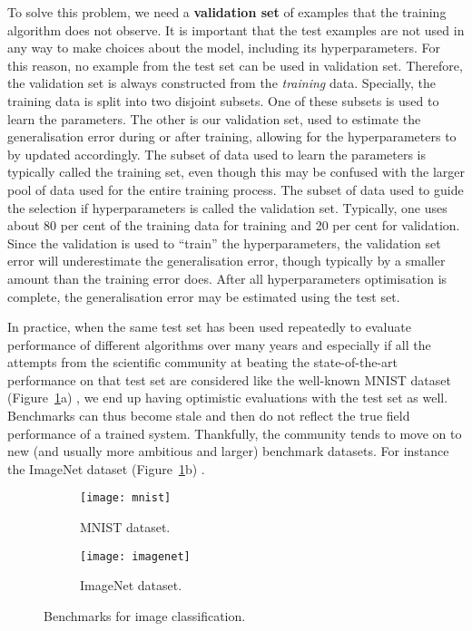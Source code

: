 To solve this problem, we need a \textbf{validation set} of examples that the
training algorithm does not observe. It is important that the test examples are
not used in any way to make choices about the model, including its
hyperparameters. For this reason, no example from the test set can be used in
validation set. Therefore, the validation set is always constructed from the
\emph{training} data. Specially, the training data is split into two disjoint
subsets. One of these subsets is used to learn the parameters. The other is our
validation set, used to estimate the generalisation error during or after
training, allowing for the hyperparameters to by updated accordingly. The
subset of data used to learn the parameters is typically called the training
set, even though this may be confused with the larger pool of data used for the
entire training process. The subset of data used to guide the selection if
hyperparameters is called the validation set. Typically, one uses about 80 per
cent of the training data for training and 20 per cent for validation. Since
the validation is used to ``train'' the hyperparameters, the validation set error
will underestimate the generalisation error, though typically by a smaller
amount than the training error does. After all hyperparameters optimisation is
complete, the generalisation error may be estimated using the test set.


In practice, when the same test set has been used repeatedly to evaluate
performance of different algorithms over many years and especially if all the
attempts from the scientific community at beating the state-of-the-art
performance on that test set are considered like the well-known MNIST
dataset (Figure~\ref{fig:mnist_imagenet}a) \cite{mnist_dataset}, we end up
having optimistic evaluations with the test set as well. Benchmarks can thus
become stale and then do not reflect the true field performance of a trained
system. Thankfully, the community tends to move on to new (and usually more
ambitious and larger) benchmark datasets. For instance the ImageNet dataset
(Figure~\ref{fig:mnist_imagenet}b) \cite{imagenet_cvpr09}.
\begin{figure}[h]
    \centering
    \begin{subfigure}[b]{0.495\linewidth}
        \texttt{[image: mnist]}
        \caption{MNIST dataset.}
    \end{subfigure}
    \begin{subfigure}[b]{0.495\linewidth}
        \texttt{[image: imagenet]}
        \caption{ImageNet dataset.}
    \end{subfigure}
    \caption{Benchmarks for image classification.}
    \label{fig:mnist_imagenet}
\end{figure}
